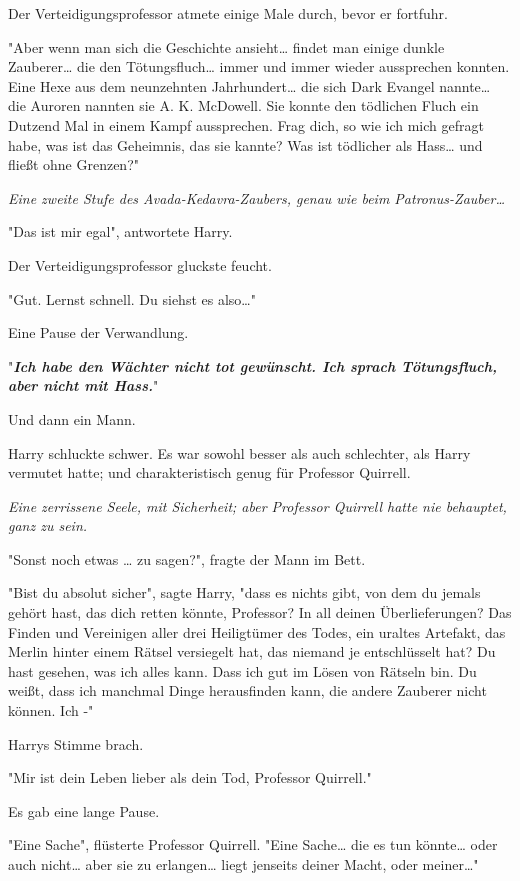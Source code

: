 {Der Verteidigungsprofessor atmete einige Male durch, bevor er fortfuhr.

"Aber wenn man sich die Geschichte ansieht… findet man einige dunkle Zauberer… die den Tötungsfluch… immer und immer wieder aussprechen konnten. Eine Hexe aus dem neunzehnten Jahrhundert… die sich Dark Evangel nannte… die Auroren nannten sie A. K. McDowell. Sie konnte den tödlichen Fluch ein Dutzend Mal in einem Kampf aussprechen. Frag dich, so wie ich mich gefragt habe, was ist das Geheimnis, das sie kannte? Was ist tödlicher als Hass… und fließt ohne Grenzen?"

\emph{Eine zweite Stufe des Avada-Kedavra-Zaubers, genau wie beim Patronus-Zauber…}

"Das ist mir egal", antwortete Harry.

Der Verteidigungsprofessor gluckste feucht.

"Gut. Lernst schnell. Du siehst es also…"

Eine Pause der Verwandlung.

"\textbf{\emph{Ich habe den Wächter nicht tot gewünscht. Ich sprach Tötungsfluch, aber nicht mit Hass.}}"

Und dann ein Mann.

Harry schluckte schwer. Es war sowohl besser als auch schlechter, als Harry vermutet hatte; und charakteristisch genug für Professor Quirrell.

\emph{Eine zerrissene Seele, mit Sicherheit; aber Professor Quirrell hatte nie behauptet, ganz zu sein.}

"Sonst noch etwas … zu sagen?", fragte der Mann im Bett.

"Bist du absolut sicher", sagte Harry, "dass es nichts gibt, von dem du jemals gehört hast, das dich retten könnte, Professor? In all deinen Überlieferungen? Das Finden und Vereinigen aller drei Heiligtümer des Todes, ein uraltes Artefakt, das Merlin hinter einem Rätsel versiegelt hat, das niemand je entschlüsselt hat? Du hast gesehen, was ich alles kann. Dass ich gut im Lösen von Rätseln bin. Du weißt, dass ich manchmal Dinge herausfinden kann, die andere Zauberer nicht können. Ich -"

Harrys Stimme brach.

"Mir ist dein Leben lieber als dein Tod, Professor Quirrell."

Es gab eine lange Pause.

"Eine Sache", flüsterte Professor Quirrell. "Eine Sache… die es tun könnte… oder auch nicht… aber sie zu erlangen… liegt jenseits deiner Macht, oder meiner…"

}
